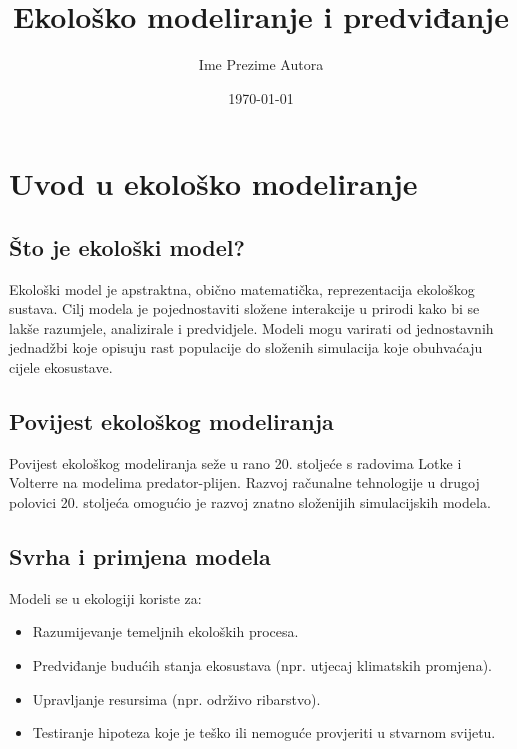 \documentclass[12pt, a4paper]{book}
\title{Ekološko modeliranje i predviđanje}
\author{Ime Prezime Autora}
\date{\today}
\begin{document}
	
	\maketitle
	\frontmatter %
	
	\tableofcontents
	
	\mainmatter %
	
	\chapter{Uvod u ekološko modeliranje}
	
	\section{Što je ekološki model?}
	Ekološki model je apstraktna, obično matematička, reprezentacija ekološkog sustava. Cilj modela je pojednostaviti složene interakcije u prirodi kako bi se lakše razumjele, analizirale i predvidjele. Modeli mogu varirati od jednostavnih jednadžbi koje opisuju rast populacije do složenih simulacija koje obuhvaćaju cijele ekosustave.
	
	\section{Povijest ekološkog modeliranja}
	Povijest ekološkog modeliranja seže u rano 20. stoljeće s radovima Lotke i Volterre na modelima predator-plijen. Razvoj računalne tehnologije u drugoj polovici 20. stoljeća omogućio je razvoj znatno složenijih simulacijskih modela.
	
	\section{Svrha i primjena modela}
	Modeli se u ekologiji koriste za:
	\begin{itemize}
		\item Razumijevanje temeljnih ekoloških procesa.
		\item Predviđanje budućih stanja ekosustava (npr. utjecaj klimatskih promjena).
		\item Upravljanje resursima (npr. održivo ribarstvo).
		\item Testiranje hipoteza koje je teško ili nemoguće provjeriti u stvarnom svijetu.
	\end{itemize}
	
\end{document}
